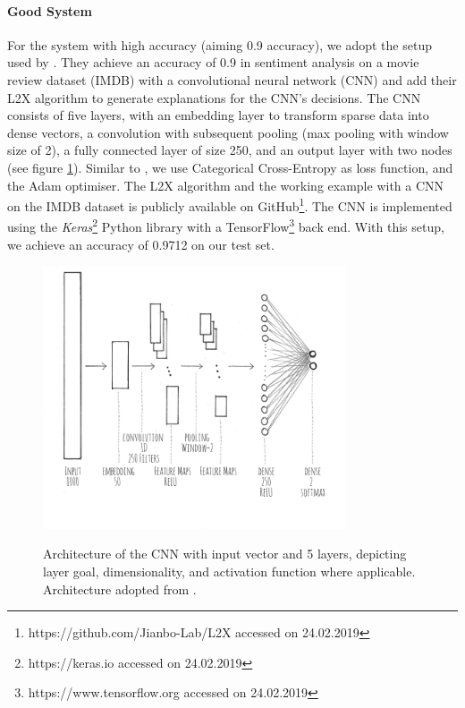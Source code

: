\paragraph{Good System}
For the system with high accuracy (aiming 0.9 accuracy), we adopt the setup used by \cite{chen2018learning}. They achieve an accuracy of 0.9 in sentiment analysis on a movie review dataset (IMDB) with a convolutional neural network (CNN) and add their L2X algorithm to generate explanations for the CNN's decisions. The CNN consists of five layers, with an embedding layer to transform sparse data into dense vectors, a convolution with subsequent pooling (max pooling with window size of 2), a fully connected layer of size 250, and an output layer with two nodes (see figure \ref{fig:impl_cnn}). Similar to \cite{chen2012detecting}, we use Categorical Cross-Entropy as loss function, and the Adam optimiser. The L2X algorithm and the working example with a CNN on the IMDB dataset is publicly available on GitHub\footnote{https://github.com/Jianbo-Lab/L2X accessed on 24.02.2019}. The CNN is implemented using the \textit{Keras}\footnote{https://keras.io accessed on 24.02.2019} Python library with a TensorFlow\footnote{https://www.tensorflow.org accessed on 24.02.2019} back end. With this setup, we achieve an accuracy of 0.9712 on our test set. 
\begin{figure} [!ht]
	\centering
	\includegraphics[width=0.8\textwidth]{img/impl_cnn.JPG}\\
	\caption{Architecture of the CNN with input vector and 5 layers, depicting layer goal, dimensionality, and activation function where applicable. Architecture adopted from \cite{chen2018learning}.}
	\label{fig:impl_cnn}
\end{figure}

